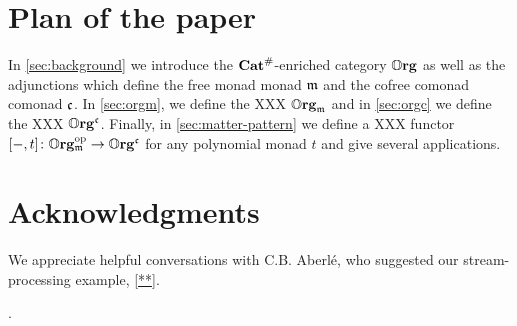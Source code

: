\section*{Plan of the paper}

In \cref{sec:background} we introduce the $\mathbf{Cat}^\#$-enriched category $\mathbb{O}\mathbf{rg}$ as well as the adjunctions which define the free monad monad $\mathfrak{m}$ and the cofree comonad comonad $\mathfrak{c}$. 
In \cref{sec:orgm}, we define the XXX $\mathbb{O}\mathbf{rg}_{\mathfrak{m}}$ and in \cref{sec:orgc} we define the XXX $\mathbb{O}\mathbf{rg}^{\mathfrak{c}}$. 
Finally, in \cref{sec:matter-pattern} we define a XXX functor $[-, t] \colon \mathbb{O}\mathbf{rg}_{\mathfrak{m}}^{\textnormal{op}} \to \mathbb{O}\mathbf{rg}^{\mathfrak{c}}$ for any polynomial monad $t$ and give several applications. 

\section*{Acknowledgments}
We appreciate helpful conversations with C.B. Aberl\'e, who suggested our stream-processing example, \cref{**}.

.